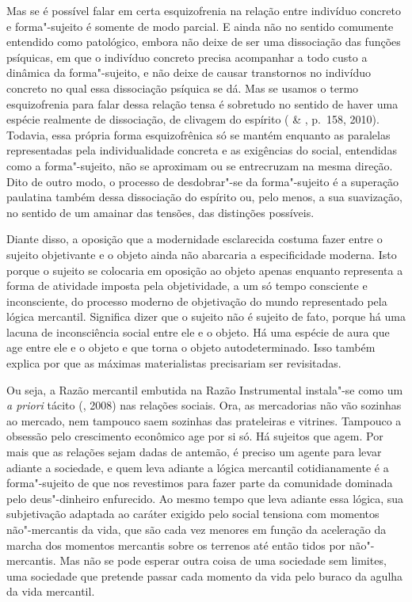 Mas se é possível falar em certa esquizofrenia na relação entre
indivíduo concreto e forma"-sujeito é somente de modo parcial. E ainda
não no sentido comumente entendido como patológico, embora não deixe de
ser uma dissociação das funções psíquicas, em que o indivíduo concreto
precisa acompanhar a todo custo a dinâmica da forma"-sujeito, e não deixe
de causar transtornos no indivíduo concreto no qual essa dissociação
psíquica se dá. Mas se usamos o termo esquizofrenia para falar dessa
relação tensa é sobretudo no sentido de haver uma espécie realmente de
dissociação, de clivagem do espírito ( \& , p.~158,
2010). Todavia, essa própria forma esquizofrênica só se mantém enquanto
as paralelas representadas pela individualidade concreta e as exigências
do social, entendidas como a forma"-sujeito, não se aproximam ou se
entrecruzam na mesma direção. Dito de outro modo, o processo de
desdobrar"-se da forma"-sujeito é a superação paulatina também dessa
dissociação do espírito ou, pelo menos, a sua suavização, no sentido de
um amainar das tensões, das distinções possíveis.

Diante disso, a oposição que a modernidade esclarecida costuma fazer
entre o sujeito objetivante e o objeto ainda não abarcaria a
especificidade moderna. Isto porque o sujeito se colocaria em oposição
ao objeto apenas enquanto representa a forma de atividade imposta pela
objetividade, a um só tempo consciente e inconsciente, do processo
moderno de objetivação do mundo representado pela lógica mercantil.
Significa dizer que o sujeito não é sujeito de fato, porque há uma
lacuna de inconsciência social entre ele e o objeto. Há uma espécie de
aura que age entre ele e o objeto e que torna o objeto autodeterminado.
Isso também explica por que as máximas materialistas precisariam ser
revisitadas.

Ou seja, a Razão mercantil embutida na Razão Instrumental instala"-se
como um \emph{a priori} tácito (, 2008) nas relações sociais. Ora,
as mercadorias não vão sozinhas ao mercado, nem tampouco saem sozinhas
das prateleiras e vitrines. Tampouco a obsessão pelo crescimento
econômico age por si só. Há sujeitos que agem. Por mais que as relações
sejam dadas de antemão, é preciso um agente para levar adiante a
sociedade, e quem leva adiante a lógica mercantil cotidianamente é a
forma"-sujeito de que nos revestimos para fazer parte da comunidade dominada
pelo deus"-dinheiro enfurecido. Ao mesmo tempo que leva adiante essa lógica, sua
subjetivação adaptada ao caráter exigido pelo social tensiona com
momentos não"-mercantis da vida, que são cada vez menores em função da
aceleração da marcha dos momentos mercantis sobre os terrenos até então
tidos por não"-mercantis. Mas não se pode esperar outra coisa de uma
sociedade sem limites, uma sociedade que pretende passar cada momento da
vida pelo buraco da agulha da vida mercantil.


